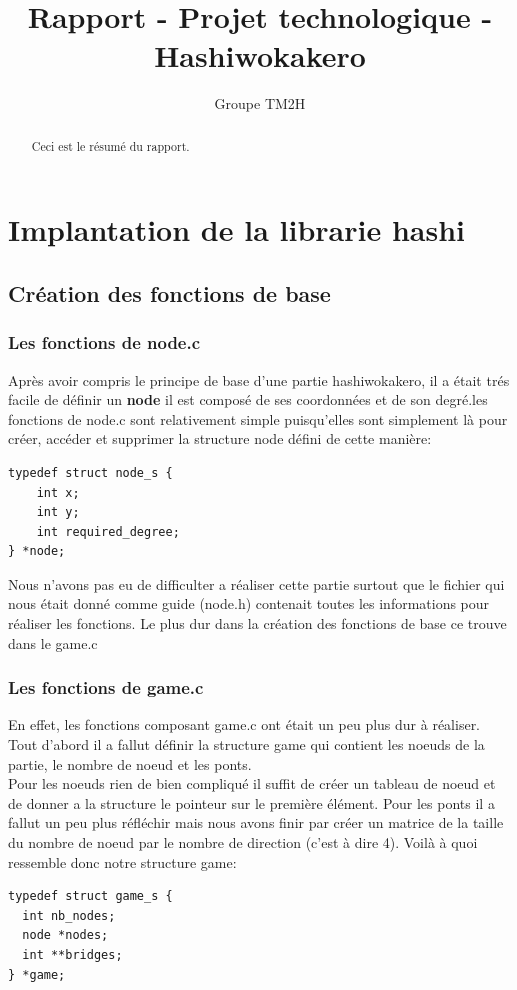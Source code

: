 \documentclass[12pt]{report}
\title{Rapport - Projet technologique - Hashiwokakero}
\author{Groupe TM2H}
\begin{document}
\maketitle

\begin{abstract}
Ceci est le résumé du rapport.
\end{abstract}

\tableofcontents

\chapter{Implantation de la librarie hashi}

\section{Création des fonctions de base}

\subsection{Les fonctions de node.c}
\textnormal{Après avoir compris le principe de base d'une partie hashiwokakero, il a était trés facile de définir un \textbf{node} il est composé de ses coordonnées et de son degré.les fonctions de node.c sont relativement simple puisqu'elles sont simplement là pour créer, accéder et supprimer la structure node défini de cette manière:}
\begin{verbatim}
typedef struct node_s {
	int x;
	int y;
	int required_degree;
} *node;
\end{verbatim}

\textnormal{Nous n'avons pas eu de difficulter a réaliser cette partie surtout que le fichier qui nous était donné comme guide (node.h) contenait toutes les informations pour réaliser les fonctions. Le plus dur dans la création des fonctions de base ce trouve dans le game.c}
\subsection{Les fonctions de game.c}
\textnormal{En effet, les fonctions composant game.c ont était un peu plus dur à réaliser. Tout d'abord il a fallut définir la structure game qui contient les noeuds de la partie, le nombre de noeud et les ponts.\\ Pour les noeuds rien de bien compliqué il suffit de créer un tableau de noeud et de donner a la structure le pointeur sur le première élément. Pour les ponts il a fallut un peu plus réfléchir mais nous avons finir par créer un matrice de la taille du nombre de noeud par le nombre de direction (c'est à dire 4). Voilà à quoi ressemble donc notre structure game:}
\begin{verbatim}
typedef struct game_s {
  int nb_nodes;
  node *nodes; 
  int **bridges;
} *game;
\end{verbatim}
\end{document}
